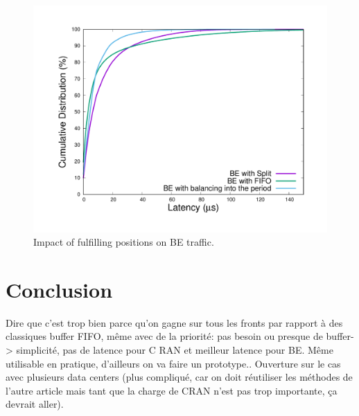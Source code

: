\documentclass[10pt, conference, letterpaper]{IEEEtran}
\begin{document}
\begin{figure}[h!]
\begin{center}   

      \includegraphics[scale=0.25]{splitres}
     \caption{Impact of fulfilling positions on BE traffic.}   \label{fig:splitres}
\end{center}
  \end{figure}
  
  \section*{Conclusion}
  
  Dire que c'est trop bien parce qu'on gagne sur tous les fronts par rapport à des classiques
  buffer FIFO, même avec de la priorité:
  pas besoin ou presque de buffer-> simplicité, pas de latence pour C RAN et meilleur latence
  pour BE. 
    Même utilisable en pratique, d'ailleurs on va faire un prototype..
  Ouverture sur le cas avec plusieurs data centers (plus compliqué, car on doit réutiliser les méthodes de l'autre article mais tant que la charge de CRAN n'est pas trop importante, ça devrait aller).
  

\end{document}

